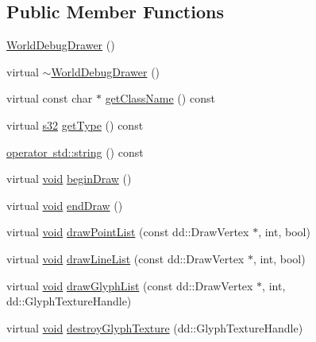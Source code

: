 \subsection*{Public Member Functions}
\begin{DoxyCompactItemize}
\item 
\mbox{\hyperlink{classnjli_1_1_world_debug_drawer_ab55308c80918b35de864ddf762be9415}{World\+Debug\+Drawer}} ()
\item 
virtual \mbox{\hyperlink{classnjli_1_1_world_debug_drawer_a741f540999f852b736db76368719e2cf}{$\sim$\+World\+Debug\+Drawer}} ()
\item 
virtual const char $\ast$ \mbox{\hyperlink{classnjli_1_1_world_debug_drawer_a08488c8e987f18b7186d5ca50650db99}{get\+Class\+Name}} () const
\item 
virtual \mbox{\hyperlink{_util_8h_aa62c75d314a0d1f37f79c4b73b2292e2}{s32}} \mbox{\hyperlink{classnjli_1_1_world_debug_drawer_a151c4b9f151d90e03df92f412346e876}{get\+Type}} () const
\item 
\mbox{\hyperlink{classnjli_1_1_world_debug_drawer_ad8b4bbf6151d5f233dce54b012d9f395}{operator std\+::string}} () const
\item 
virtual \mbox{\hyperlink{_thread_8h_af1e856da2e658414cb2456cb6f7ebc66}{void}} \mbox{\hyperlink{classnjli_1_1_world_debug_drawer_a058930605d9a5adbf095701584dededf}{begin\+Draw}} ()
\item 
virtual \mbox{\hyperlink{_thread_8h_af1e856da2e658414cb2456cb6f7ebc66}{void}} \mbox{\hyperlink{classnjli_1_1_world_debug_drawer_ad0f3fbe3f3f062800792178a1b83318e}{end\+Draw}} ()
\item 
virtual \mbox{\hyperlink{_thread_8h_af1e856da2e658414cb2456cb6f7ebc66}{void}} \mbox{\hyperlink{classnjli_1_1_world_debug_drawer_aa840ccc55092f26d9ed20ca1ceae1670}{draw\+Point\+List}} (const dd\+::\+Draw\+Vertex $\ast$, int, bool)
\item 
virtual \mbox{\hyperlink{_thread_8h_af1e856da2e658414cb2456cb6f7ebc66}{void}} \mbox{\hyperlink{classnjli_1_1_world_debug_drawer_ab4547ab7ddab242ff2a402c691ce7c72}{draw\+Line\+List}} (const dd\+::\+Draw\+Vertex $\ast$, int, bool)
\item 
virtual \mbox{\hyperlink{_thread_8h_af1e856da2e658414cb2456cb6f7ebc66}{void}} \mbox{\hyperlink{classnjli_1_1_world_debug_drawer_a902a5a10ef3b87d602cd87e2cd37c3e4}{draw\+Glyph\+List}} (const dd\+::\+Draw\+Vertex $\ast$, int, dd\+::\+Glyph\+Texture\+Handle)
\item 
virtual \mbox{\hyperlink{_thread_8h_af1e856da2e658414cb2456cb6f7ebc66}{void}} \mbox{\hyperlink{classnjli_1_1_world_debug_drawer_a7d7fc930e719f3fd0715c860df1cbca7}{destroy\+Glyph\+Texture}} (dd\+::\+Glyph\+Texture\+Handle)

\end{DoxyCompactItemize}
